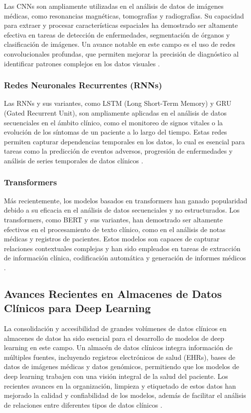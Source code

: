 \documentclass{article}
\begin{document}
Las CNNs son ampliamente utilizadas en el análisis de datos de imágenes médicas, como resonancias magnéticas, tomografías y radiografías. Su capacidad para extraer y procesar características espaciales ha demostrado ser altamente efectiva en tareas de detección de enfermedades, segmentación de órganos y clasificación de imágenes. Un avance notable en este campo es el uso de redes convolucionales profundas, que permiten mejorar la precisión de diagnóstico al identificar patrones complejos en los datos visuales \cite{litjens2017survey}.

\subsubsection{Redes Neuronales Recurrentes (RNNs)}

Las RNNs y sus variantes, como LSTM (Long Short-Term Memory) y GRU (Gated Recurrent Unit), son ampliamente aplicadas en el análisis de datos secuenciales en el ámbito clínico, como el monitoreo de signos vitales o la evolución de los síntomas de un paciente a lo largo del tiempo. Estas redes permiten capturar dependencias temporales en los datos, lo cual es esencial para tareas como la predicción de eventos adversos, progresión de enfermedades y análisis de series temporales de datos clínicos \cite{choi2016doctor}.

\subsubsection{Transformers}

Más recientemente, los modelos basados en transformers han ganado popularidad debido a su eficacia en el análisis de datos secuenciales y no estructurados. Los transformers, como BERT y sus variantes, han demostrado ser altamente efectivos en el procesamiento de texto clínico, como en el análisis de notas médicas y registros de pacientes. Estos modelos son capaces de capturar relaciones contextuales complejas y han sido empleados en tareas de extracción de información clínica, codificación automática y generación de informes médicos \cite{devlin2018bert, li2020behrt}.

\subsection{Avances Recientes en Almacenes de Datos Clínicos para Deep Learning}

La consolidación y accesibilidad de grandes volúmenes de datos clínicos en almacenes de datos ha sido esencial para el desarrollo de modelos de deep learning en este campo. Un almacén de datos clínicos integra información de múltiples fuentes, incluyendo registros electrónicos de salud (EHRs), bases de datos de imágenes médicas y datos genómicos, permitiendo que los modelos de deep learning trabajen con una visión integral de la salud del paciente. Los recientes avances en la organización, limpieza y etiquetado de estos datos han mejorado la calidad y confiabilidad de los modelos, además de facilitar el análisis de relaciones entre diferentes tipos de datos clínicos \cite{miotto2018deep}.
\\
\end{document}
